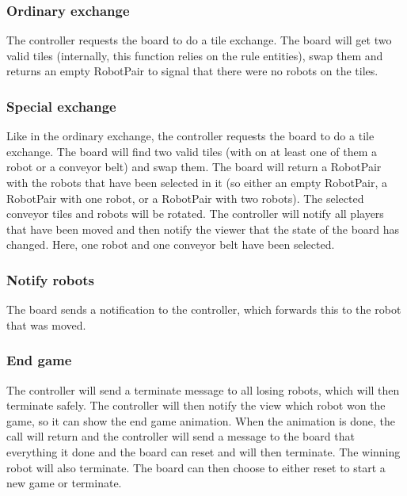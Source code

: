 	



	\subsubsection{Ordinary exchange}
	The controller requests the board to do a tile exchange. The board will get two valid tiles (internally, this function relies on the rule entities), swap them and returns an empty RobotPair to signal that there were no robots on the tiles.

	

	\subsubsection{Special exchange}
	Like in the ordinary exchange, the controller requests the board to do a tile exchange. The board will find two valid tiles (with on at least one of them a robot or a conveyor belt) and swap them. The board will return a RobotPair with the robots that have been selected in it (so either an empty RobotPair, a RobotPair with one robot, or a RobotPair with two robots). The selected conveyor tiles and robots will be rotated. The controller will notify all players that have been moved and then notify the viewer that the state of the board has changed. Here, one robot and one conveyor belt have been selected.

	
	
	\subsubsection{Notify robots}
	The board sends a notification to the controller, which forwards this to the robot that was moved.	

	

	\subsubsection{End game}
	The controller will send a terminate message to all losing robots, which will then terminate safely. The controller will then notify the view which robot won the game, so it can show the end game animation. When the animation is done, the call will return and the controller will send a message to the board that everything it done and the board can reset and will then terminate. The winning robot will also terminate. The board can then choose to either reset to start a new game or terminate.

	
